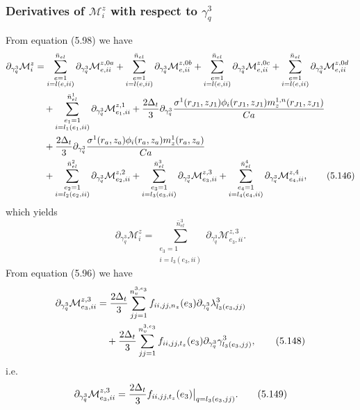 \documentclass{article}
\begin{document}
\subsubsection{Derivatives of $\mathcal{M}_i^z$ with respect to $\gamma_q^3$} %
From equation (5.98) we have
\begin{align}
\partial_{\gamma_q^3}\mathcal{M}_i^z &= \sum_{\substack{e=1\\ i=l(e,ii)}}^{\bar{n}_{el}} \partial_{\gamma_q^3} \mathcal{M}_{e,ii}^{z,0a} + \sum_{\substack{e=1\\ i=l(e,ii)}}^{\bar{n}_{el}} \partial_{\gamma_q^3} \mathcal{M}_{e,ii}^{z,0b} + \sum_{\substack{e=1\\ i=l(e,ii)}}^{\bar{n}_{el}} \partial_{\gamma_q^3} \mathcal{M}_{e,ii}^{z,0c} + \sum_{\substack{e=1\\ i=l(e,ii)}}^{\bar{n}_{el}} \partial_{\gamma_q^3} \mathcal{M}_{e,ii}^{z,0d} \nonumber\\
&\quad + \sum_{\substack{e_1=1\\ i=l_1(e_1,ii)}}^{\bar{n}_{el}^1} \partial_{\gamma_q^3} \mathcal{M}_{e_1,ii}^{z,1} + \frac{2\Delta_t}{3} \partial_{\gamma_q^3} \frac{\sigma^1(r_{J1},z_{J1}) \phi_i(r_{J1},z_{J1}) m_z^{1,n}(r_{J1},z_{J1})}{Ca} \nonumber\\
&\quad + \frac{2\Delta_t}{3} \partial_{\gamma_q^3} \frac{\sigma^1(r_a,z_a) \phi_i(r_a,z_a) m_z^{1}(r_a,z_a)}{Ca} \nonumber\\
&\quad + \sum_{\substack{e_2=1\\ i=l_2(e_2,ii)}}^{\bar{n}_{el}^2} \partial_{\gamma_q^3} \mathcal{M}_{e_2,ii}^{z,2} + \sum_{\substack{e_3=1\\ i=l_3(e_3,ii)}}^{\bar{n}_{el}^3} \partial_{\gamma_q^3} \mathcal{M}_{e_3,ii}^{z,3} + \sum_{\substack{e_4=1\\ i=l_4(e_4,ii)}}^{\bar{n}_{el}^4} \partial_{\gamma_q^3} \mathcal{M}_{e_4,ii}^{z,4}, \tag{5.146}
\end{align}
which yields
\begin{equation}
\partial_{\gamma_q^3}\mathcal{M}_i^z = \sum_{\substack{e_3=1\\ i=l_3(e_3,ii)}}^{\bar{n}_{el}^3} \partial_{\gamma_q^3} \mathcal{M}_{e_3,ii}^{z,3}. \tag{5.147}
\end{equation}
From equation (5.96) we have
\begin{align}
\partial_{\gamma_q^3}\mathcal{M}_{e_3,ii}^{z,3} &= \frac{2\Delta_t}{3} \sum_{jj=1}^{n_v^{3,e_3}} f_{ii,jj,n_z}(e_3) \partial_{\gamma_q^3} \lambda_{l_3(e_3,jj)}^3 \nonumber\\
&\quad + \frac{2\Delta_t}{3} \sum_{jj=1}^{n_v^{3,e_3}} f_{ii,jj,t_z}(e_3) \partial_{\gamma_q^3} \gamma_{l_3(e_3,jj)}^3, \tag{5.148}
\end{align}
i.e.
\begin{equation}
\partial_{\gamma_q^3}\mathcal{M}_{e_3,ii}^{z,3} = \frac{2\Delta_t}{3} f_{ii,jj,t_z}(e_3) \big|_{q=l_3(e_3,jj)}. \tag{5.149}
\end{equation}
\end{document}
